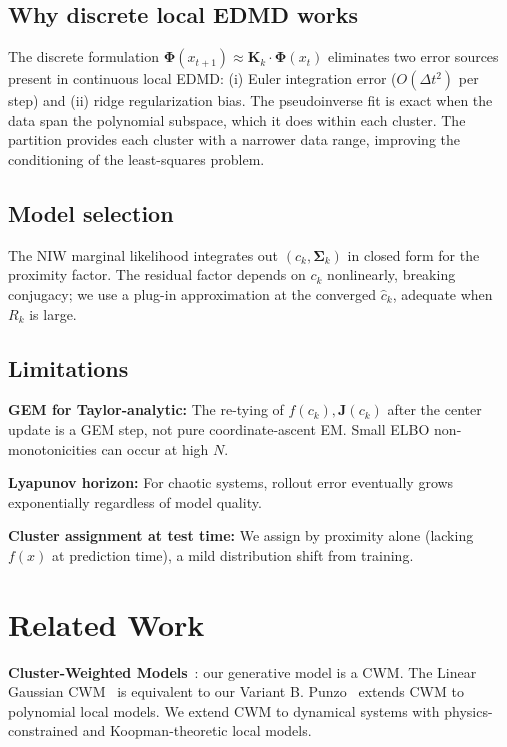 \documentclass[11pt]{article}
\theoremstyle{definition}
\newcommand{\Sv}{\boldsymbol{\Sigma}}
\newcommand{\Phiv}{\boldsymbol{\Phi}}
\newcommand{\Jv}{\boldsymbol{J}}
\newcommand{\Kv}{\boldsymbol{K}}
\begin{document}
\subsection{Why discrete local EDMD works}

The discrete formulation $\Phiv(x_{t+1})\approx\Kv_k\cdot\Phiv(x_t)$ eliminates two error sources present in continuous local EDMD: (i) Euler integration error ($O(\Delta t^2)$ per step) and (ii) ridge regularization bias. The pseudoinverse fit is exact when the data span the polynomial subspace, which it does within each cluster. The partition provides each cluster with a narrower data range, improving the conditioning of the least-squares problem.

\subsection{Model selection}

The NIW marginal likelihood integrates out $(c_k,\Sv_k)$ in closed form for the proximity factor. The residual factor depends on $c_k$ nonlinearly, breaking conjugacy; we use a plug-in approximation at the converged $\hat{c}_k$, adequate when $R_k$ is large.

\subsection{Limitations}

\textbf{GEM for Taylor-analytic:} The re-tying of $f(c_k),\Jv(c_k)$ after the center update is a GEM step, not pure coordinate-ascent EM. Small ELBO non-monotonicities can occur at high $N$.

\textbf{Lyapunov horizon:} For chaotic systems, rollout error eventually grows exponentially regardless of model quality.

\textbf{Cluster assignment at test time:} We assign by proximity alone (lacking $f(x)$ at prediction time), a mild distribution shift from training.

\section{Related Work}

\textbf{Cluster-Weighted Models}~\cite{gershenfeld1997,gershenfeld1999nature,ingrassia2012,ingrassia2014}: our generative model is a CWM. The Linear Gaussian CWM~\cite{ingrassia2012} is equivalent to our Variant B. Punzo~\cite{punzo2014poly} extends CWM to polynomial local models. We extend CWM to dynamical systems with physics-constrained and Koopman-theoretic local models.
\end{document}
